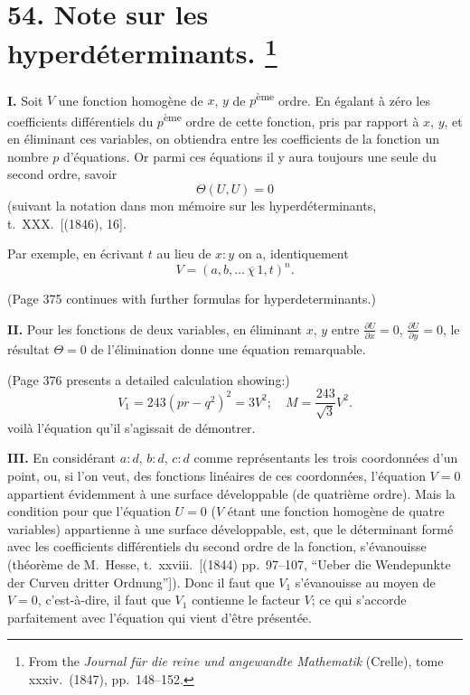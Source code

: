 \documentclass[11pt,a4paper]{book}
\begin{document}
\newpage
\section[Note sur les hyperd\'{e}terminants]{%
54. Note sur les hyperd\'{e}terminants.%
\footnote{From the \textit{Journal f\"{u}r die reine und angewandte Mathematik} (Crelle), tome xxxiv.\ (1847), pp.~148--152.}}

\textbf{I.}
Soit $V$ une fonction homog\`{e}ne de $x$, $y$ de $p$\textsuperscript{\`{e}me} ordre.
En \'{e}galant \`{a} z\'{e}ro les coefficients diff\'{e}rentiels du $p$\textsuperscript{\`{e}me} ordre de
cette fonction, pris par rapport \`{a} $x$, $y$, et en \'{e}liminant ces variables,
on obtiendra entre les coefficients de la fonction un nombre $p$ d'\'{e}quations.
Or parmi ces \'{e}quations il y aura toujours une seule du second ordre, savoir
\[
\Theta(U, U) = 0
\]
(suivant la notation dans mon m\'{e}moire sur les hyperd\'{e}terminants, t.~XXX.\ [(1846), 16].

Par exemple, en \'{e}crivant $t$ au lieu de $x:y$ on a, identiquement
\[
V = (a, b, \ldots \,\overline{\!\!\chi\,} 1, t)^n.
\]

(Page 375 continues with further formulas for hyperdeterminants.)

\textbf{II.}
Pour les fonctions de deux variables, en \'{e}liminant $x$, $y$ entre
$\frac{\partial U}{\partial x} = 0$, $\frac{\partial U}{\partial y} = 0$, le r\'{e}sultat $\Theta = 0$
de l'\'{e}limination donne une \'{e}quation remarquable.

(Page 376 presents a detailed calculation showing:)
\[
V_1 = 243(pr - q^2)^2 = 3V^2; \quad M = \frac{243}{\sqrt{3}} V^2.
\]
voil\`{a} l'\'{e}quation qu'il s'agissait de d\'{e}montrer.

\textbf{III.}
En consid\'erant $a:d$, $b:d$, $c:d$ comme repr\'{e}sentants les trois coordonn\'{e}es
d'un point, ou, si l'on veut, des fonctions lin\'{e}aires de ces coordonn\'{e}es,
l'\'{e}quation $V = 0$ appartient \'{e}videmment \`{a} une surface d\'{e}veloppable
(de quatri\`{e}me ordre). Mais la condition pour que l'\'{e}quation $U = 0$
($V$ \'{e}tant une fonction homog\`{e}ne de quatre variables) appartienne \`{a}
une surface d\'{e}veloppable, est, que le d\'{e}terminant form\'{e} avec les coefficients
diff\'{e}rentiels du second ordre de la fonction, s'\'{e}vanouisse
(th\'{e}or\`{e}me de M.~Hesse, t.~xxviii.\ [(1844) pp.~97--107,
``Ueber die Wendepunkte der Curven dritter Ordnung'']).
Donc il faut que $V_1$ s'\'{e}vanouisse au moyen de $V = 0$, c'est-\`{a}-dire,
il faut que $V_1$ contienne le facteur $V$; ce qui s'accorde parfaitement
avec l'\'{e}quation qui vient d'\^{e}tre pr\'{e}sent\'{e}e.
\end{document}
